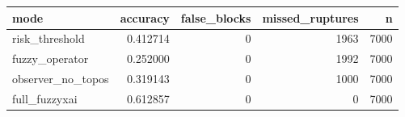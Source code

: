 \begin{tabular}{lrrrr}
\toprule
mode & accuracy & false\_blocks & missed\_ruptures & n \\
\midrule
risk\_threshold & 0.412714 & 0 & 1963 & 7000 \\
fuzzy\_operator & 0.252000 & 0 & 1992 & 7000 \\
observer\_no\_topos & 0.319143 & 0 & 1000 & 7000 \\
full\_fuzzyxai & 0.612857 & 0 & 0 & 7000 \\
\bottomrule
\end{tabular}
